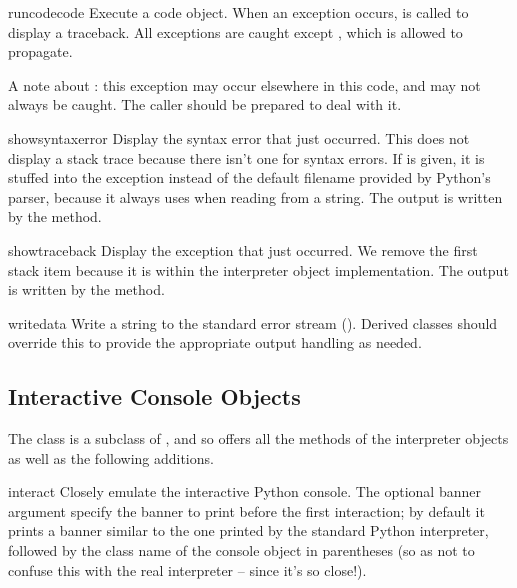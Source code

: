 \begin{methoddesc}{runcode}{code}
Execute a code object.
When an exception occurs,  is called to
display a traceback.  All exceptions are caught except
, which is allowed to propagate.

A note about : this exception may occur
elsewhere in this code, and may not always be caught.  The caller
should be prepared to deal with it.
\end{methoddesc}

\begin{methoddesc}{showsyntaxerror}{}
Display the syntax error that just occurred.  This does not display
a stack trace because there isn't one for syntax errors.
If  is given, it is stuffed into the exception instead
of the default filename provided by Python's parser, because it
always uses  when reading from a string.
The output is written by the  method.
\end{methoddesc}

\begin{methoddesc}{showtraceback}{}
Display the exception that just occurred.  We remove the first stack
item because it is within the interpreter object implementation.
The output is written by the  method.
\end{methoddesc}

\begin{methoddesc}{write}{data}
Write a string to the standard error stream ().
Derived classes should override this to provide the appropriate output
handling as needed.
\end{methoddesc}


\subsection{Interactive Console Objects
            \label{console-objects}}

The  class is a subclass of
, and so offers all the methods of the
interpreter objects as well as the following additions.

\begin{methoddesc}{interact}{}
Closely emulate the interactive Python console.
The optional banner argument specify the banner to print before the
first interaction; by default it prints a banner similar to the one
printed by the standard Python interpreter, followed by the class
name of the console object in parentheses (so as not to confuse this
with the real interpreter -- since it's so close!).
\end{methoddesc}

